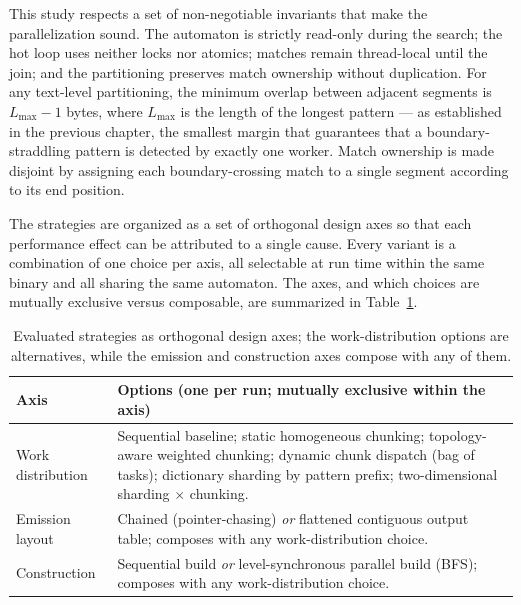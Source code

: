 This study respects a set of non-negotiable invariants that make the
parallelization sound. The automaton is strictly read-only during the search;
the hot loop uses neither locks nor atomics; matches remain thread-local until
the join; and the partitioning preserves match ownership without duplication.
For any text-level partitioning, the minimum overlap between adjacent segments
is $L_{\max}-1$ bytes, where $L_{\max}$ is the length of the longest pattern --- as established in the previous chapter, the smallest margin that guarantees that a boundary-straddling pattern is detected by exactly one worker. Match ownership is made disjoint by assigning each
boundary-crossing match to a single segment according to its end position.


The strategies are organized as a set of orthogonal design axes so that each
performance effect can be attributed to a single cause. Every variant is a
combination of one choice per axis, all selectable at run time within the same
binary and all sharing the same automaton. The axes, and which choices are
mutually exclusive versus composable, are summarized in
Table~\ref{tab:variants}.

\begin{table}[H]
    \centering
    \caption{Evaluated strategies as orthogonal design axes; the work-distribution
    options are alternatives, while the emission and construction axes compose with any of them.}
    \label{tab:variants}
    \small
    \begin{tabular}{@{} l p{9cm} @{}}
        \toprule
        \textbf{Axis} & \textbf{Options (one per run; mutually exclusive within the axis)} \\
        \midrule
        Work distribution & Sequential baseline; static homogeneous chunking; topology-aware weighted chunking; dynamic chunk dispatch (bag of tasks); dictionary sharding by pattern prefix; two-dimensional sharding $\times$ chunking. \\ \addlinespace
        Emission layout & Chained (pointer-chasing) \emph{or} flattened contiguous output table; composes with any work-distribution choice. \\ \addlinespace
        Construction & Sequential build \emph{or} level-synchronous parallel build (BFS); composes with any work-distribution choice. \\
        \bottomrule
    \end{tabular}

\end{table}

